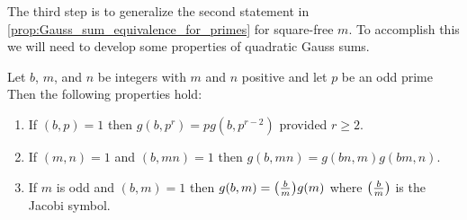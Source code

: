     The third step is to generalize the second statement in \cref{prop:Gauss_sum_equivalence_for_primes} for square-free \(m\). To accomplish this we will need to develop some properties of quadratic Gauss sums.

    \begin{proposition}\label{prop:quadratic_Gauss_sum_reduction}
      Let \(b\), \(m\), and \(n\) be integers with \(m\) and \(n\) positive and let \(p\) be an odd prime Then the following properties hold:
      \begin{enumerate}[label*=(\roman*)]
        \item If \((b,p) = 1\) then \(g(b,p^{r}) = pg(b,p^{r-2})\) provided \(r \ge 2\).
        \item If \((m,n) = 1\) and \((b,mn) = 1\) then \(g(b,mn) = g(bn,m)g(bm,n)\).
        \item If \(m\) is odd and \((b,m) = 1\) then \(g(b,m) = \textstyle{\left(\frac{b}{m}\right)}g(m)\) where \(\textstyle{\left(\frac{b}{m}\right)}\) is the Jacobi symbol.
      \end{enumerate}
    \end{proposition}
